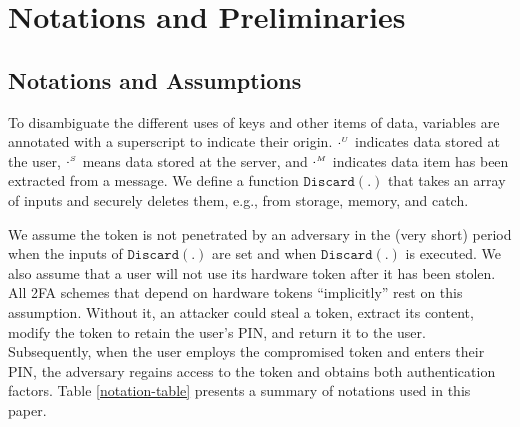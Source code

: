 

\section{Notations and Preliminaries}
 \subsection{Notations and Assumptions}
  
 To disambiguate the different uses of keys and other items of data, variables are annotated with a superscript to indicate their origin. $\cdot^{\scriptscriptstyle U}$ indicates data stored at the user, $\cdot^{\scriptscriptstyle S}$ means data stored at the server, and $\cdot^{\scriptscriptstyle M}$ indicates data item has been extracted from a message. We define a function $\mathtt{Discard}(.)$ that takes an array of inputs and securely deletes them, e.g., from storage, memory, and catch. 
 
 We assume the token is not penetrated by an adversary in the (very short) period when the inputs of $\mathtt{Discard}(.)$ are set and when  $\mathtt{Discard}(.)$ is executed. %
  We also assume that a user will not use its hardware token after it has been stolen. All 2FA schemes that depend on hardware tokens ``implicitly'' rest on this assumption. Without it, an attacker could steal a token, extract its content, modify the token to retain the user's PIN, and return it to the user. Subsequently, when the user employs the compromised token and enters their PIN, the adversary regains access to the token and obtains both authentication factors. Table \ref{notation-table} presents a summary of notations used in this paper. 
 

 
 
% 
% 
% 
% 
% 
% 
% 
% 
% 
 
